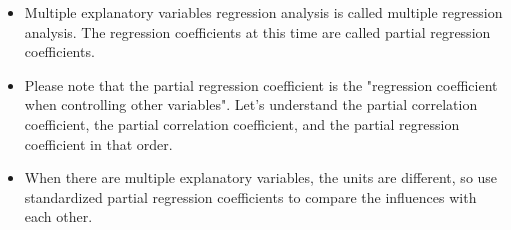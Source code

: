 \begin{itemize}
	\item Multiple explanatory variables regression analysis is called multiple regression analysis. The regression coefficients at this time are called partial regression coefficients.
	\item Please note that the partial regression coefficient is the "regression coefficient when controlling other variables". Let's understand the partial correlation coefficient, the partial correlation coefficient, and the partial regression coefficient in that order.
	\item When there are multiple explanatory variables, the units are different, so use standardized partial regression coefficients to compare the influences with each other.
\end{itemize}
